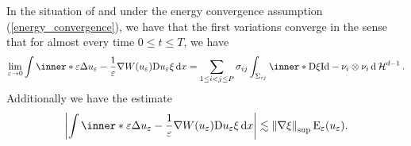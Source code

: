 \begin{proposition}
	\label{convergence_of_curvature_multiphase}
	In the situation of  and under 
	the energy convergence assumption (\ref{energy_convergence}), we have that 
	the first variations converge in the sense that for almost every time $ 0 
	\leq t \leq T $, we have
	\begin{equation*}
		\lim_{ \varepsilon \to 0 }
		\int
		\inner*{ 
			\varepsilon \Delta u_{ \varepsilon } - \frac{ 1 }{ 
				\varepsilon } \nabla W ( u_{ \varepsilon } ) 
		}
		{ \diff u_{ \varepsilon } \xi } 
		\dd{ x }
		=
		\sum_{ 1 \leq i < j \leq P }
		\sigma_{ i j }
		\int_{ \Sigma_{ i j } }
		\inner*{ \diff \xi }{ \mathrm{Id} - \nu_{ i } \otimes \nu_{ i } }
		\dd{ \hm^{ d - 1} }.
	\end{equation*}
	Additionally we have the estimate
	\begin{equation}
		\label{pointwise_estimate_for_curvature}
		\abs{
		\int
		\inner*{ 
			\varepsilon \Delta u_{ \varepsilon } - \frac{ 1 }{ \varepsilon } 	
			\nabla W ( u_{ \varepsilon } ) }
		{ \diff u_{ \varepsilon } \xi }
		\dd{ x }
		}
		\lesssim
		\norm{ \nabla \xi }_{ \sup }
		\energy_{ \varepsilon } ( u_{ \varepsilon } ).
	\end{equation}
\end{proposition}

